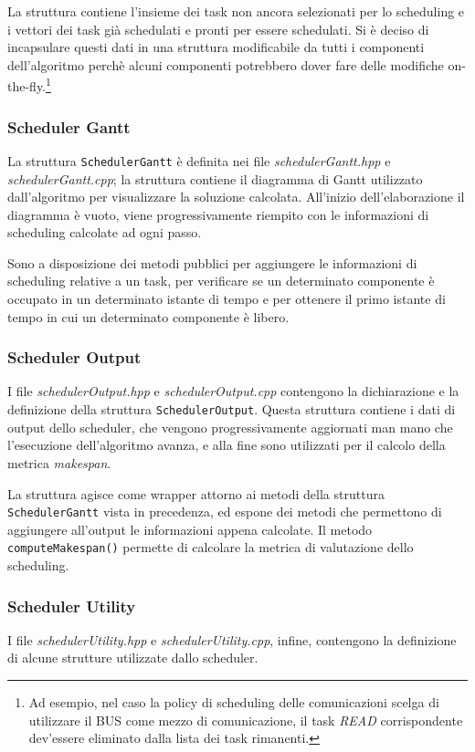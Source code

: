 La struttura contiene l'insieme dei task non ancora 
selezionati per lo scheduling e i vettori dei task già schedulati e pronti per 
essere schedulati. Si è deciso di incapsulare questi dati in una struttura 
modificabile da tutti i componenti dell'algoritmo perchè alcuni componenti 
potrebbero dover fare delle modifiche on-the-fly.\footnote{Ad esempio, nel caso 
la policy di scheduling delle comunicazioni scelga di utilizzare il BUS come 
mezzo di comunicazione, il task \emph{READ} corrispondente dev'essere 
eliminato dalla lista dei task rimanenti.}

\subsubsection{Scheduler Gantt}
La struttura \verb+SchedulerGantt+ è definita nei file 
\emph{schedulerGantt.hpp} e \emph{schedulerGantt.cpp}; la struttura contiene il 
diagramma di Gantt utilizzato dall'algoritmo per visualizzare la soluzione 
calcolata. All'inizio dell'elaborazione il diagramma è vuoto, viene 
progressivamente riempito con le informazioni di scheduling calcolate ad ogni 
passo.

Sono a disposizione dei metodi pubblici per aggiungere le informazioni di 
scheduling relative a un task, per verificare se un determinato componente è 
occupato in un determinato istante di tempo e per ottenere il primo istante di 
tempo in cui un determinato componente è libero.

\subsubsection{Scheduler Output}
I file \emph{schedulerOutput.hpp} e \emph{schedulerOutput.cpp} contengono la 
dichiarazione e la definizione della struttura \verb+SchedulerOutput+. Questa 
struttura contiene i dati di output dello scheduler, che vengono 
progressivamente aggiornati man mano che l'esecuzione dell'algoritmo avanza, e 
alla fine sono utilizzati per il calcolo della metrica \emph{makespan}.

La struttura agisce come wrapper attorno ai 
metodi della struttura \verb+SchedulerGantt+ vista in precedenza, ed espone dei 
metodi che permettono di aggiungere all'output le informazioni appena calcolate.
Il metodo \verb+computeMakespan()+ permette di calcolare la metrica di valutazione
dello scheduling.

\subsubsection{Scheduler Utility}
I file \emph{schedulerUtility.hpp} e \emph{schedulerUtility.cpp}, infine, 
contengono la definizione di alcune strutture utilizzate dallo 
scheduler.

